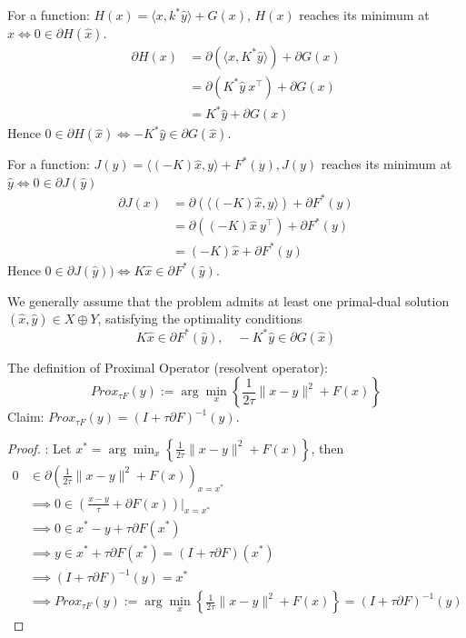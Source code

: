 \documentclass[twoside,12pt,openright]{report}  %
\begin{document}
For a function: \(H(x) = \langle x, k^* \hat{y} \rangle + G(x)\), \(H(x)\) reaches its minimum at \(\hat{x} \iff 0 \in \partial H(\hat{x})\). 
\[
\begin{aligned}
\partial H(x) &= \partial (\langle x, K^* \hat{y} \rangle ) + \partial G(x) \\
&= \partial (K^* \hat{y} \ x^\top  ) + \partial G(x) \\
&= K^* \hat{y} + \partial G(x)
\end{aligned}
\]
Hence \( 0 \in \partial H(\hat{x}) \iff -K^*\hat{y} \in \partial G(\hat{x})\).

For a function: \(J(y) = \langle (-K)\hat{x}, y \rangle + F^*(y), J(y)\) reaches its minimum at \(\hat{y} \iff 0 \in \partial J(\hat{y})\) 
\[
\begin{aligned}
\partial J(x) &= \partial (\langle (-K)\hat{x}, y \rangle ) + \partial F^*(y) \\
&= \partial ((-K)\hat{x} \ y^\top  ) + \partial F^*(y) \\
&= (-K)\hat{x} + \partial F^*(y)
\end{aligned}
\]
Hence \( 0 \in \partial J(\hat{y})) \iff K\hat{x} \in \partial F^*(\hat{y})\).

We generally assume that the problem admits at least one primal-dual solution \((\hat{x}, \hat{y}) \in X \oplus Y\), satisfying the optimality conditions
\[
K \hat{x} \in \partial F^*(\hat{y}), \quad -K^* \hat{y} \in \partial G(\hat{x})
\]

The definition of Proximal Operator (resolvent operator):
\[
Prox_{\tau F}(y) := \arg\min_{x}\left\{ \frac{1}{2\tau}\|x - y\|^2 + F(x) \right\}
\]
Claim: \(Prox_{\tau F}(y) = (I + \tau \partial F)^{-1}(y)\).

\begin{proof}: Let \(x^* = \arg\min_{x}\left\{ \frac{1}{2\tau}\|x - y\|^2 + F(x) \right\}\), then \begin{align*}
0 &\in \partial \left(\frac{1}{2\tau}\|x - y\|^2 + F(x)\right)_{x=x^*} \\
  &\implies 0 \in \left(\frac{x - y}{\tau} + \partial F(x)\right)\big|_{x = x^*} \\
  &\implies 0 \in x^* - y + \tau \partial F(x^*) \\
  &\implies y \in x^* + \tau \partial F(x^*) = (I + \tau \partial F)(x^*) \\
  &\implies (I + \tau \partial F)^{-1}(y) = x^* \\
  &\implies Prox_{\tau F}(y) := \arg\min_{x}\left\{ \frac{1}{2\tau}\|x - y\|^2 + F(x) \right\} = (I + \tau \partial F)^{-1}(y) \ \ \ 
\end{align*}\end{proof}
\end{document}
